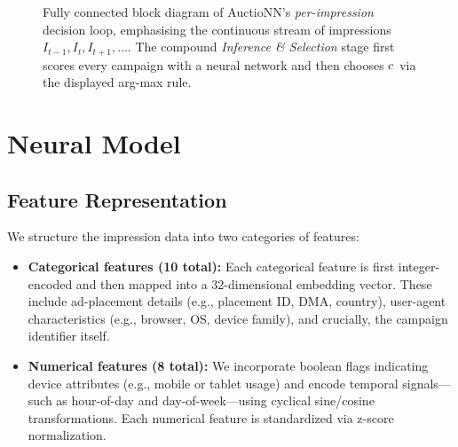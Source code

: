 \documentclass[11pt]{article}
\begin{document}
\begin{figure}[H]
  \caption{Fully connected block diagram of AuctioNN’s
    \emph{per-impression} decision loop, emphasising the continuous stream
    of impressions \(I_{t-1}, I_t, I_{t+1}, \dots\).  The compound
    \emph{Inference \& Selection} stage first scores every campaign with a
    neural network and then chooses \(c^{\*}\) via the displayed arg-max
  rule.}
  \label{fig:auctionn-loop-final}
\end{figure}
\newpage

\vspace{-0.5em}
\section{Neural Model}\label{sec:nn}

\subsection{Feature Representation}

We structure the impression data into two categories of features:

\begin{itemize}
  \item \textbf{Categorical features (10 total):} Each categorical feature is first integer-encoded and then mapped into a \SI{32}{\dimensionless}-dimensional embedding vector. These include ad-placement details (e.g., placement ID, DMA, country), user-agent characteristics (e.g., browser, OS, device family), and crucially, the campaign identifier itself.
  
  \item \textbf{Numerical features (8 total):} We incorporate boolean flags indicating device attributes (e.g., mobile or tablet usage) and encode temporal signals—such as hour-of-day and day-of-week—using cyclical sine/cosine transformations. Each numerical feature is standardized via z-score normalization.
\end{itemize}
\end{document}
